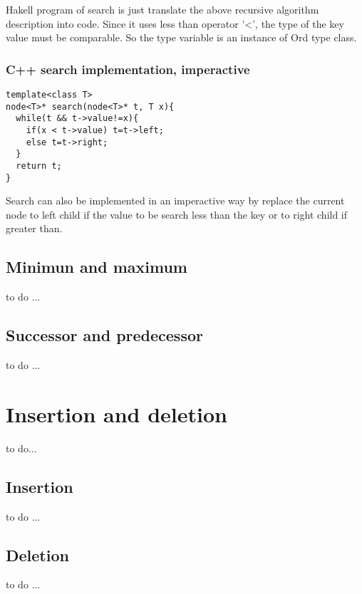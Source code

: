 \documentclass{article}
\begin{document}
Hakell program of search is just translate the above recursive algorithm
description into code. Since it uses less than operator '<', the type
of the key value must be comparable. So the type variable is an instance 
of Ord type class.

\subsubsection*{C++ search implementation, imperactive}
\lstset{language=C++}
\begin{lstlisting}
template<class T>
node<T>* search(node<T>* t, T x){
  while(t && t->value!=x){
    if(x < t->value) t=t->left;
    else t=t->right;
  }
  return t;
}
\end{lstlisting}

Search can also be implemented in an imperactive way by replace the current
node to left child if the value to be search less than the key or to right 
child if greater than.

\subsection{Minimun and maximum}

to do ...

\subsection{Successor and predecessor}

to do ...

\section{Insertion and deletion}

to do...

\subsection{Insertion}

to do ...

\subsection{Deletion}

to do ...
\end{document}
